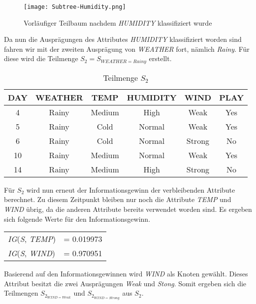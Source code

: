 \begin{figure}[htbp]
    \centering
    \texttt{[image: Subtree-Humidity.png]}
    \caption{Vorläufiger Teilbaum nachdem \textit{HUMIDITY} klassifiziert wurde}
\end{figure}

Da nun die Ausprägungen des Attributes \textit{HUMIDITY} klassifiziert worden sind fahren wir mit der zweiten Ausprägung von \textit{WEATHER} fort, nämlich \textit{Rainy}. Für diese wird die Teilmenge $S_{2} = S_{WEATHER=Rainy}$ erstellt.

\begin{table}[htbp]
    \centering
    \begin{tabular}{cccccc}
        \toprule
        \textbf{DAY} & \textbf{WEATHER} & \textbf{TEMP} & \textbf{HUMIDITY} & \textbf{WIND} & \textbf{PLAY} \\
        \toprule
        4   &Rainy	&Medium	&High	&Weak	&Yes \\
        5   &Rainy	&Cold	&Normal	&Weak	&Yes \\
        6   &Rainy	&Cold	&Normal	&Strong	&No  \\
        10  &Rainy	&Medium	&Normal	&Weak	&Yes \\
        14  &Rainy	&Medium	&High	&Strong	&No  \\
        \bottomrule
    \end{tabular}
    \caption{Teilmenge $S_{2}$}
    \label{table:datensatz-Rainy}
\end{table}

Für $S_{2}$ wird nun erneut der Informationsgewinn der verbleibenden Attribute berechnet. Zu diesem Zeitpunkt bleiben nur noch die Attribute \textit{TEMP} und \textit{WIND} übrig, da die anderen Attribute bereits verwendet worden sind. Es ergeben sich folgende Werte für den Informationsgewinn.

\begin{table}[htbp]
    \centering
    \begin{tabular}{lc}
        \textit{IG}(\textit{S}, \textit{TEMP})     &= 0.019973 \\
        \textit{IG}(\textit{S}, \textit{WIND})     &= 0.970951 \\
    \end{tabular}
\end{table}

Basierend auf den Informationsgewinnen wird \textit{WIND} als Knoten gewählt. Dieses Attribut besitzt die zwei Ausprägungen \textit{Weak} und \textit{Stong}. Somit ergeben sich die Teilmengen $S_{2_{WIND=Weak}}$ und $S_{2_{WIND=Strong}}$ aus $S_{2}$.

